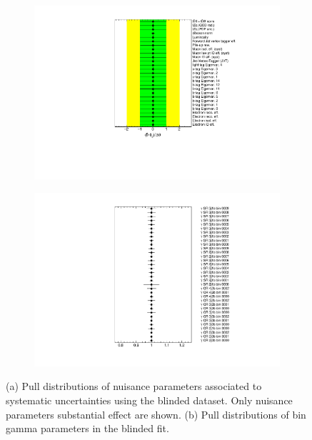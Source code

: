 \begin{figure}[!h] 
  \begin{subfigure}[b]{0.49\linewidth}
    \centering
    \includegraphics[width=1.24\textwidth]{ubonn-thesis/Chapters/Chapters_07/Figure/Asmiov/NuisPar.pdf}
    \caption{}
    \label{fig:asimovpull}
  \end{subfigure}%
  \begin{subfigure}[b]{0.49\linewidth}
    \centering
    \includegraphics[width=1.1\textwidth]{ubonn-thesis/Chapters/Chapters_07/Figure/Asmiov/Gammas.pdf}
   \caption{}
   \label{fig:asimovgamma}
  \end{subfigure}
  \caption{(a) Pull distributions of nuisance parameters associated to systematic uncertainties using the blinded dataset. Only nuisance parameters substantial effect are shown. (b) Pull distributions of bin gamma parameters in the blinded fit.}
\end{figure}

